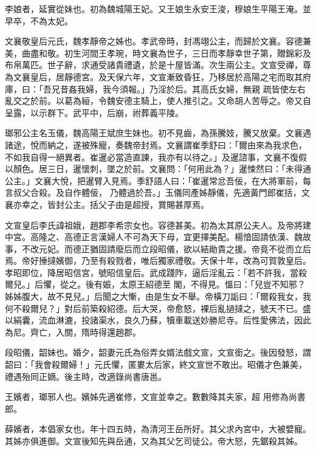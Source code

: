 \begin{pinyinscope}
 李娘者，延實從妹也。初為魏城陽王妃。又王娘生永安王浚，穆娘生平陽王淹。並早卒，不為太妃。



 文襄敬皇后元氏，魏孝靜帝之姊也。孝武帝時，封馮翊公主，而歸於文襄。容德兼美，曲盡和敬。初生河間王孝琬，時文襄為世子，三日而孝靜幸世子第，贈錦彩及布帛萬匹。世子辭，求通受諸貴禮遺，於是十屋皆滿。次生兩公主。文宣受禪，尊為文襄皇后，居靜德宮。及天保六年，文宣漸致昏狂，乃移居於高陽之宅而取其府庫，曰：「吾兄昔姦我婦，我今須報。」乃淫於后。其高氏女婦，無親
 疏皆使左右亂交之於前。以葛為絙，令魏安德主騎上，使人推引之。又命胡人苦辱之。帝又自呈露，以示群下。武平中，后崩，祔葬義平陵。



 瑯邪公主名玉儀，魏高陽王斌庶生妹也。初不見齒，為孫騰妓，騰又放棄。文襄遇諸途，悅而納之，遂被殊寵，奏魏帝封焉。文襄謂崔季舒曰：「爾由來為我求色，不如我自得一絕異者。崔暹必當造直諫，我亦有以待之。」及暹諮事，文襄不復假以顏色。居三日，暹懷刺，墜之於前。文襄問：「何用此為？」暹悚然曰：「未得通公主。」文襄大悅，把暹臂入見焉。季舒語人曰：「崔暹常忿吾佞，在大將軍前，每言叔父合殺。及自作體佞，
 乃體過於吾。」玉儀同產姊靜儀，先適黃門郎崔括，文襄亦幸之，皆封公主。括父子由是超授，賞賜甚厚焉。



 文宣皇后李氏諱祖娥，趙郡李希宗女也。容德甚美。初為太其原公夫人。及帝將建中宮。高隆之、高德正言漢婦人不可為天下母，宜更擇美配。楊愔固請依漢、魏故事，不改元妃。而德正猶固請廢后而立段昭儀，欲以結勛貴之援。帝竟不從而立后焉。帝好捶撻嬪御，乃至有殺戮者，唯后獨家禮敬。天保十年，改為可賀敦皇后。孝昭即位，降居昭信宮，號昭信皇后。武成踐阼，逼后淫亂云：「若不許我，當殺爾兒。」后懼，從之。後有娠，太原王紹德至
 閣，不得見。慍曰：「兒豈不知邪？姊姊腹大，故不見兒。」后聞之大慚，由是生女不舉。帝橫刀詬曰：「爾殺我女，我何不殺爾兒？」對后前築殺紹德。后大哭，帝愈怒，裸后亂撾撻之，號天不已。盛以絹囊，流血淋漉，投諸渠水，良久乃蘇，犢車載送妙勝尼寺。后性愛佛法，因此為尼。齊亡，入關，隋時得還趙郡。



 段昭儀，韶妹也。婚夕，韶妻元氏為俗弄女婿法戲文宣，文宣銜之。後因發怒，謂韶曰：「我會殺爾婦！」元氏懼，匿婁太后家，終文宣世不敢出。昭儀才色兼美，禮遇殆同正嫡。後主時，改適錄尚書唐邕。



 王嬪者，瑯邪人也。嬪姊先適崔修，文宣並幸之。數數降其夫家，超
 用修為尚書郎。



 薛嬪者，本倡家女也。年十四五時，為清河王岳所好。其父求內宮中，大被嬖寵。其姊亦俱進御。文宣後知先與岳通，又為其父乞司徒公。帝大怒，先鋸殺其姊。




\end{pinyinscope}
